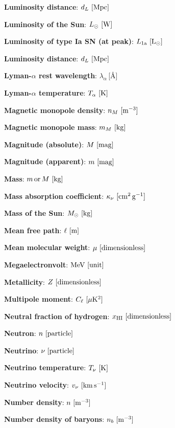 \documentclass[a4paper,11pt]{article}
\begin{document}
{\noindent}\textbf{Luminosity distance}: $d_L ~ [{\rm Mpc}]$

{\noindent}\textbf{Luminosity of the Sun}: $L_\odot ~ [{\rm W}]$

{\noindent}\textbf{Luminosity of type Ia SN (at peak)}: $L_\mathrm{1a} ~ [{\rm L_\odot}]$

{\noindent}\textbf{Luminosity distance}: $d_L ~ [{\rm Mpc}]$

{\noindent}\textbf{Lyman-$\alpha$ rest wavelength}: $\lambda_\alpha$\,[\AA]

{\noindent}\textbf{Lyman-$\alpha$ temperature}: $T_\alpha ~ [{\rm K}]$

{\noindent}\textbf{Magnetic monopole density}: $n_M ~ [{\rm m^{-3}}]$

{\noindent}\textbf{Magnetic monopole mass}: $m_M ~ [{\rm kg}]$

{\noindent}\textbf{Magnitude (absolute)}: $M ~ [{\rm mag}]$

{\noindent}\textbf{Magnitude (apparent)}: $m ~ [{\rm mag}]$

{\noindent}\textbf{Mass}: $m\,{\rm or}\,M ~ [{\rm kg}]$

{\noindent}\textbf{Mass absorption coefficient}: $\kappa_\nu ~ [{\rm cm^2\,g^{-1}}]$

{\noindent}\textbf{Mass of the Sun}: $M_\odot ~ [{\rm kg}]$

{\noindent}\textbf{Mean free path}: $\ell ~ [{\rm m}]$

{\noindent}\textbf{Mean molecular weight}: $\mu ~ [{\rm dimensionless}]$

{\noindent}\textbf{Megaelectronvolt}: ${\rm MeV} ~ [{\rm unit}]$

{\noindent}\textbf{Metallicity}: $Z ~ [{\rm dimensionless}]$

{\noindent}\textbf{Multipole moment}: $C_\ell ~ [{\rm \mu K^2}]$

{\noindent}\textbf{Neutral fraction of hydrogen}: $x_\mathrm{HI} ~ [{\rm dimensionless}]$

{\noindent}\textbf{Neutron}: $n ~ [{\rm particle}]$

{\noindent}\textbf{Neutrino}: $\nu ~ [{\rm particle}]$

{\noindent}\textbf{Neutrino temperature}: $T_\nu ~ [{\rm K}]$

{\noindent}\textbf{Neutrino velocity}: $v_\nu ~ [{\rm km\,s^{-1}}]$

{\noindent}\textbf{Number density}: $n ~ [{\rm m^{-3}}]$

{\noindent}\textbf{Number density of baryons}: $n_b ~ [{\rm m^{-3}}]$
\end{document}
